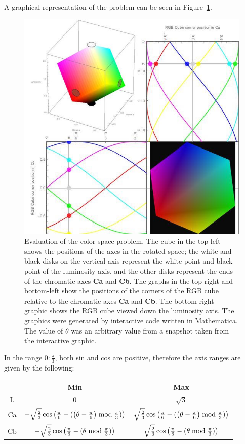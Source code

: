 A graphical representation of the problem can be seen in Figure~\ref{fig:YABCubeEval}.

\begin{figure}[h!] %
  \centering
    \includegraphics[width=\textwidth]{Chapter2/Figs/CornersOf_theRGBCube.jpg}
    \caption{Evaluation of the color space problem. The cube in the top-left shows the positions of the axes in the rotated space; the white and black disks on the vertical axis represent the white point and black point of the luminosity axis, and the other disks represent the ends of the chromatic axes \textbf{Ca} and \textbf{Cb}. The graphs in the top-right and bottom-left show the positions of the corners of the RGB cube relative to the chromatic axes \textbf{Ca} and \textbf{Cb}. The bottom-right graphic shows the RGB cube viewed down the luminosity axis. The graphics were generated by interactive code written in Mathematica. The value of $\theta$ was an arbitrary value from a snapshot taken from the interactive graphic.}\label{fig:YABCubeEval}
\end{figure}

In the range $0:\frac{\pi}{3}$, both sin and cos are positive, therefore the axis ranges are given by the following:

\begin{tabular}{|c|c|c|}
  \hline
    & Min & Max \\ \hline
  L & \(0\) & \(\sqrt{3}\) \\
  Ca & \(- \sqrt{\frac{2}{3}} \cos \left(\frac{\pi}{6}-(\left(\theta -\frac{\pi}{6}\right) \bmod \frac{\pi }{3})\right) \)&\( \sqrt{\frac{2}{3}} \cos \left(\frac{\pi}{6}-(\left(\theta -\frac{\pi}{6}\right) \bmod \frac{\pi }{3})\right) \)\\
 Cb & \(-\sqrt{\frac{2}{3}} \cos \left(\frac{\pi}{6}-(\theta  \bmod \frac{\pi }{3})\right) \)&\( \sqrt{\frac{2}{3}} \cos \left(\frac{\pi}{6}-(\theta  \bmod \frac{\pi }{3})\right) \)\\
  \hline
\end{tabular}

